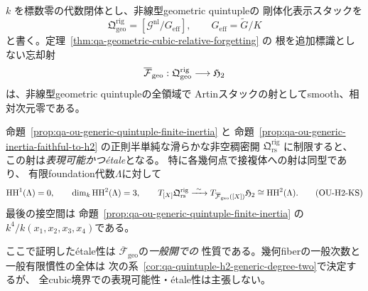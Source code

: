\begin{theorem}
\label{thm:qa-quintuple-h2-generic-etale}
$k$ を標数零の代数閉体とし、非線型geometric quintupleの
剛体化表示スタックを
\[
 \mathfrak Q_{\mathrm{geo}}^{\mathrm{rig}}
 =[\mathscr G^{\mathrm{nl}}/G_{\mathrm{eff}}],
 \qquad G_{\mathrm{eff}}=\widetilde G/K
\]
と書く。定理~\ref{thm:qa-geometric-cubic-relative-forgetting} の
根を追加標識としない忘却射
\[
 \overline{\mathcal F}_{\mathrm{geo}}:
 \mathfrak Q_{\mathrm{geo}}^{\mathrm{rig}}\longrightarrow\mathfrak H_2
\]
は、非線型geometric quintupleの全領域で
Artinスタックの射としてsmooth、相対次元零である。

命題~\ref{prop:qa-ou-generic-quintuple-finite-inertia} と
命題~\ref{prop:qa-ou-generic-inertia-faithful-to-h2}
の正則半単純な滑らかな非空稠密開
$\mathfrak Q_{\mathrm{rs}}^{\mathrm{rig}}$ に制限すると、
この射は\emph{表現可能かつétale}となる。
特に各幾何点で接複体への射は同型であり、
有限foundation代数$\Lambda$に対して
\[
 \operatorname{HH}^1(\Lambda)=0,\qquad
 \dim_k\operatorname{HH}^2(\Lambda)=3,\qquad
 T_{[X]}\mathfrak Q_{\mathrm{rs}}^{\mathrm{rig}}
 \xrightarrow{\ \sim\ }
 T_{\overline{\mathcal F}_{\mathrm{geo}}([X])}\mathfrak H_2
 \cong\operatorname{HH}^2(\Lambda).
 \tag{OU-H2-KS}\label{eq:qa-ou-h2-generic-kodaira-spencer}
\]
最後の接空間は
命題~\ref{prop:qa-ou-generic-quintuple-finite-inertia}
の$k^4/k(x_1,x_2,x_3,x_4)$である。

ここで証明したétale性は
$\overline{\mathcal F}_{\mathrm{geo}}$の\emph{一般開での}
性質である。幾何fiberの一般次数と一般有限慣性の全体は
次の系~\ref{cor:qa-quintuple-h2-generic-degree-two}で決定するが、
全cubic境界での表現可能性・étale性は主張しない。
\end{theorem}
